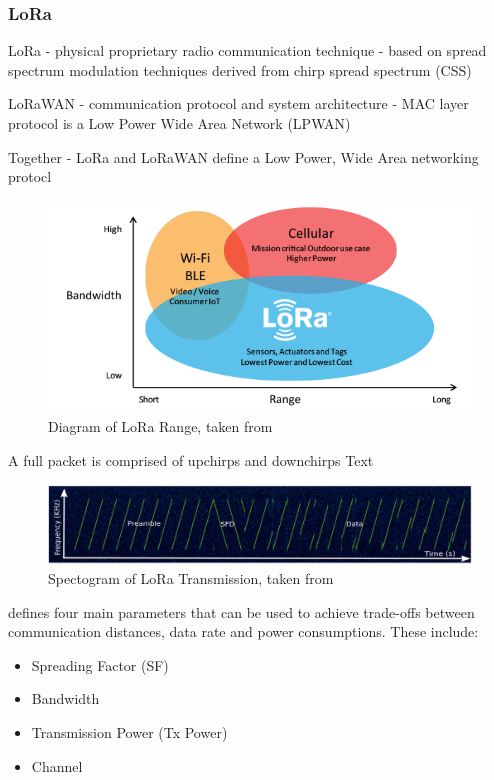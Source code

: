 \documentclass[a4paper,twoside,12pt]{report}
\begin{document}
\subsubsection{LoRa}
LoRa 
- physical proprietary radio communication technique
- based on spread spectrum modulation techniques derived from chirp spread spectrum (CSS)

LoRaWAN 
- communication protocol and system architecture
- MAC layer protocol
is a Low Power Wide Area Network (LPWAN)

Together - LoRa and LoRaWAN define a Low Power, Wide Area networking protocl

\begin{figure}[ht]
	\centering
	\includegraphics[width=0.5\linewidth]{images/LoRa_Why_Range.png}
	\caption{Diagram of LoRa Range, taken from \cite{Semtech_2023}}
	\label{fig:LoRaRange}
\end{figure}



A full packet is comprised of upchirps and downchirps \citep{Liando2019KnownStudy}
Text 

\begin{figure}[ht]
	\centering
	\includegraphics[width=0.8\linewidth]{images/LoRa transmission spectogram.png}
	\caption{Spectogram of LoRa Transmission, taken from \cite{Liando2019KnownStudy}}
	\label{fig:LoRaTransmissionSpectogram}
\end{figure}

\cite{Liando2019KnownStudy} defines four main parameters that can be used to achieve trade-offs between communication distances, data rate and power consumptions. These include:
\begin{itemize}
    \item Spreading Factor (SF)
    \item Bandwidth
    \item Transmission Power (Tx Power)
    \item Channel
\end{itemize}
\end{document}

